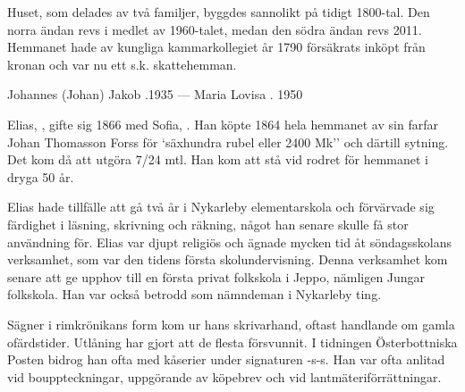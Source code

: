 Huset, som delades av två familjer, byggdes sannolikt på tidigt 1800-tal. Den norra ändan revs i medlet av 1960-talet, medan den södra ändan revs 2011. Hemmanet hade av kungliga kammarkollegiet år 1790 försäkrats inköpt från kronan och var nu ett s.k. skattehemman.

Johannes (Johan) Jakob .1935  ---  Maria Lovisa . 1950


%
Elias, , gifte sig 1866 med Sofia, . Han  köpte 1864 hela hemmanet  av sin farfar Johan Thomasson Forss för `säxhundra rubel eller 2400 Mk'' och därtill sytning. Det kom då att utgöra 7/24 mtl. Han kom att stå vid rodret för hemmanet i dryga 50 år.

Elias hade tillfälle att gå två år i Nykarleby elementarskola och förvärvade sig färdighet i läsning, skrivning och räkning, något han senare skulle få stor användning för. Elias var djupt religiös och ägnade mycken tid åt söndagsskolans verksamhet, som var den tidens första skolundervisning. Denna verksamhet kom senare att ge upphov till en första privat folkskola i Jeppo, nämligen Jungar folkskola. Han var också betrodd som nämndeman i Nykarleby ting.

Sägner i rimkrönikans form kom ur hans skrivarhand, oftast handlande om gamla ofärdstider. Utlåning har gjort att de flesta försvunnit. I tidningen Österbottniska Posten bidrog han ofta med kåserier under signaturen  -s-s. Han var ofta anlitad vid bouppteckningar, uppgörande av köpebrev och vid lantmäteriförrättningar.
\begin{jhchildren}
  \item {}
  \item {}
  \item {}
  \item {}
  \item {}
  \item {}
  \item {}
  \item {}
  \item {}
  \item {}
\end{jhchildren}

